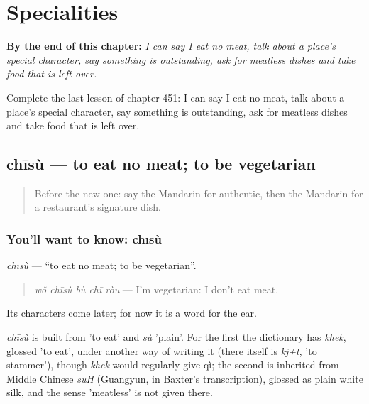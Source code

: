 
\chapter{Specialities}
\label{ch:zh-specialities}

\begin{chapteropening}
\textbf{By the end of this chapter:} \emph{I can say I eat no meat, talk about a place's special character, say something is outstanding, ask for meatless dishes and take food that is left over.}

Complete the last lesson of chapter 451: I can say I eat no meat, talk about a place's special character, say something is outstanding, ask for meatless dishes and take food that is left over.
\end{chapteropening}

\section[chīsù]{chīsù — to eat no meat; to be vegetarian}

\label{lesson:ZH-C451-chisu}



\begin{quote}
Before the new one: say the Mandarin for authentic, then the Mandarin for a restaurant's signature dish.
\end{quote}

\subsection*{You'll want to know: chīsù}
\emph{chīsù} — \textquotedblleft{}to eat no meat; to be vegetarian\textquotedblright{}.

\begin{quote}
\emph{wǒ chīsù bù chī ròu} — I'm vegetarian: I don't eat meat.
\end{quote}

Its characters come later; for now it is a word for the ear.

\begin{cousinweb}
\emph{chīsù} is built from  'to eat' and \emph{sù} 'plain'. For the first the dictionary has \emph{khek}, glossed 'to eat', under another way of writing it (there  itself is \emph{kj+t}, 'to stammer'), though \emph{khek} would regularly give qì; the second is inherited from Middle Chinese \emph{suH} (Guangyun, in Baxter's transcription), glossed as plain white silk, and the sense 'meatless' is not given there.
\end{cousinweb}

